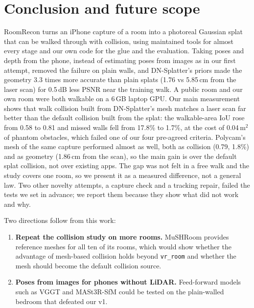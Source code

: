 \section{Conclusion and future scope}
\label{sec:conclusion}

RoomRecon turns an iPhone capture of a room into a photoreal Gaussian splat that can be walked through with collision, using maintained tools for almost every stage and our own code for the glue and the evaluation. Taking poses and depth from the phone, instead of estimating poses from images as in our first attempt, removed the failure on plain walls, and DN-Splatter's priors made the geometry 3.3 times more accurate than plain splats (1.76 vs 5.85\,cm from the laser scan) for 0.5\,dB less PSNR near the training walk. A public room and our own room were both walkable on a 6\,GB laptop GPU. Our main measurement shows that walk collision built from DN-Splatter's mesh matches a laser scan far better than the default collision built from the splat: the walkable-area IoU rose from 0.58 to 0.81 and missed walls fell from 17.8\% to 1.7\%, at the cost of 0.04\,m$^2$ of phantom obstacles, which failed one of our four pre-agreed criteria. Polycam's mesh of the same capture performed almost as well, both as collision (0.79, 1.8\%) and as geometry (1.86\,cm from the scan), so the main gain is over the default splat collision, not over existing apps. The gap was not felt in a free walk and the study covers one room, so we present it as a measured difference, not a general law. Two other novelty attempts, a capture check and a tracking repair, failed the tests we set in advance; we report them because they show what did not work and why.

Two directions follow from this work:
\begin{enumerate}
\item \textbf{Repeat the collision study on more rooms.} MuSHRoom provides reference meshes for all ten of its rooms, which would show whether the advantage of mesh-based collision holds beyond \texttt{vr\_room} and whether the mesh should become the default collision source.
\item \textbf{Poses from images for phones without LiDAR.} Feed-forward models such as VGGT \cite{wang2025vggt} and MASt3R-SfM \cite{duisterhof2025mast3rsfm} could be tested on the plain-walled bedroom that defeated our v1.
\end{enumerate}

